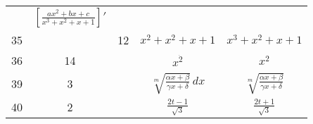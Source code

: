 \documentclass[a4paper,11pt]{article}
\begin{document}
\begin{center}
\begin{tabular}{|c|c|c|c|c|}
           & $\left[ \frac{ a x^{ 2 } + b x + c }
             { x^{ 3 } + x^{ 2 } + x + 1 } \right]'$ \\
    35  & & 12 & $x^{ 2 } + x^{ 2 } + x + 1$
           & $x^{ 3 } + x^{ 2 } + x + 1$ \\
    36  & 14 & & $x^{ \dot{ 2 } }$ & $x^{ 2 }$ \\
    39  &  3 & & $\sqrt[ m ]{
                 \frac{ \alpha x + \beta }{ \gamma x + \delta } } \, dx$
           & $\sqrt[ m ]{
             \frac{ \alpha x + \beta }{ \gamma x + \delta } }$ \\
    40  &  2 & & $\frac{ 2t - 1 }{ \sqrt{ 3 } }$
           & $\frac{ 2t + 1 }{ \sqrt{ 3 } }$ \\
    \hline
  \end{tabular}





  \newpage


\end{center}
\end{document}
